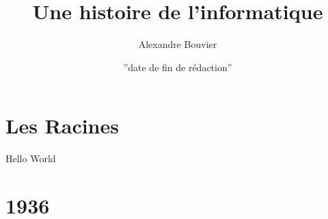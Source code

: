 \documentclass[a4paper, 11pt]{book}
\begin{document}
\title{Une histoire de l'informatique}
\author{Alexandre Bouvier}
\date{''date de fin de rédaction''}


\maketitle


\chapter{Les Racines}

  Hello World

\chapter{1936}


\tableofcontents
\end{document}
